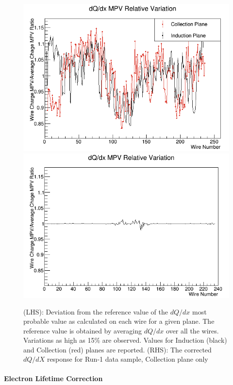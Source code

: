 \begin{figure}[h!]
\centering
\includegraphics[scale=0.35]{./images/Run1WireCorrectionFactor.png}
\includegraphics[scale=0.35]{./images/Run1WireCorrected.png}
\caption{(LHS): Deviation from the reference value of the $dQ/dx$ most probable value as calculated on each wire for a given plane. The reference value is obtained by averaging $dQ/dx$ over all the wires. Variations as high as 15\% are observed. Values for Induction (black) and Collection (red) planes are reported. (RHS): The corrected $dQ/dX$ response for Run-1 data sample, Collection plane only}
\label{fig:wirebywire}
\end{figure}

\paragraph{\textbf{Electron Lifetime Correction}}

